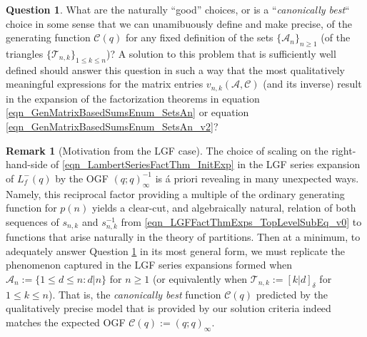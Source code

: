 \documentclass[12pt,reqno,a4letter]{article}
\numberwithin{figure}{section}
\numberwithin{table}{section}
\numberwithin{equation}{section}
\newcommand{\Iverson}[1]{\ensuremath{\left[#1\right]_{\delta}}}
\theoremstyle{plain}
\numberwithin{theorem}{section}
\theoremstyle{definition}
\newtheorem{remark}[theorem]{Remark}
\newtheorem{question}[theorem]{Question}
\begin{document}
\begin{question}
\label{question_PrecursorToCorrStats_v1}
What are the naturally ``good'' choices, 
or is a ``\emph{canonically best}`` choice in some sense that we can unamibuously define and make precise, 
of the generating function $\mathcal{C}(q)$ for any fixed definition of the sets 
$\{\mathcal{A}_n\}_{n \geq 1}$ (of the triangles $\{\mathcal{T}_{n,k}\}_{1 \leq k \leq n}$)? 
A solution to this problem that is sufficiently well defined 
should answer this question in such a way 
that the most qualitatively meaningful expressions for the matrix entries 
$v_{n,k}(\mathcal{A}, \mathcal{C})$ (and its inverse) result in the expansion of the 
factorization theorems in equation \eqref{eqn_GenMatrixBasedSumsEnum_SetsAn} or 
equation \eqref{eqn_GenMatrixBasedSumsEnum_SetsAn_v2}?
\end{question}

\begin{remark}[Motivation from the LGF case]
The choice of scaling on the right-hand-side of 
\eqref{eqn_LambertSeriesFactThm_InitExp} 
in the LGF series expansion of $L_f^{-}(q)$ by the OGF $(q; q)_{\infty}^{-1}$ 
is \'{a} priori revealing in many unexpected ways. 
Namely, this reciprocal factor providing a multiple of the 
ordinary generating function for $p(n)$ yields a clear-cut, and algebraically natural, relation of 
both sequences of $s_{n,k}$ and $s_{n,k}^{-1}$ 
from \eqref{eqn_LGFFactThmExps_TopLevelSubEq_v0} 
to functions that arise naturally in the theory of partitions. 
Then at a minimum, to adequately answer Question \ref{question_PrecursorToCorrStats_v1}
in its most general form, we must replicate the phenomenon captured in the LGF series expansions 
formed when $\mathcal{A}_n := \{1 \leq d \leq n: d|n\}$ for $n \geq 1$ 
(or equivalently when $\mathcal{T}_{n,k} := \Iverson{k|d}$ for $1 \leq k \leq n$). 
That is, the 
\emph{canonically best} function $\mathcal{C}(q)$ predicted by the qualitatively precise model that is 
provided by our solution criteria indeed matches the expected OGF 
$\mathcal{C}(q) := (q; q)_{\infty}$. 
\end{remark}
\end{document}
